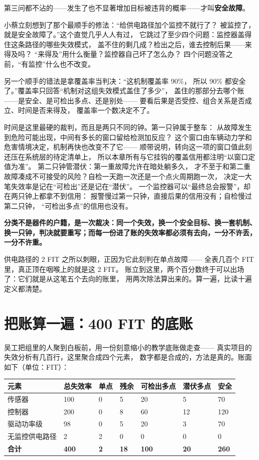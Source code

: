 第三问都不沾的——发生了也不显著增加目标被违背的概率——才叫\textbf{安全故障}。

小蔡立刻想到了那个最顺手的修法：“给供电路径加个监控不就行了？
被监控了，就是安全故障了。”这个直觉几乎人人有过，
它跳过了至少四个问题：监控器盖得住这条路径的哪些失效模式，
盖不住的剩几成？检出之后，谁去控制后果——来得及吗？
“来得及”用什么衡量？监控器自己坏了怎么办？
四个问题没答之前，“有监控”什么也不改变。

另一个顺手的错法是拿覆盖率当判决：“这机制覆盖率 90\%，
所以 90\% 都安全了。”覆盖率只回答“机制对这组失效模式盖住了多少”，
盖住的那部分去哪个账——是安全、是可检出多点、还是别处——
要看后果是否受控、组合关系是否成立、时间是否来得及，
覆盖率一个数决定不了。

时间是这里最硬的裁判，而且是两只不同的钟。第一只钟属于整车：
从故障发生到危险可能出现，中间有多长的窗口留给检测加反应？
这个窗口由车辆动力学和危害情境决定，机制再快也改变不了它——
顺带说明，转向这一项的窗口值此刻还压在系统层的待定清单上，
所以本章所有与它挂钩的覆盖信用都注明“以窗口定值为准”。
第二只钟管潜伏：第一重故障允许在暗处躺多久，
才不至于和第二重故障凑成不可接受的风险？自检一天跑一次还是一个点火周期跑一次，
决定一大笔失效率是记在“可检出”还是记在“潜伏”。
一个监控器可以“最终总会报警”，却在两只钟上都拿不到信用：
报警慢过第一只钟，直接后果的信用没有；自检慢过第二只钟，
“可检出多点”的信用也没有。

\textbf{分类不是器件的户籍，是一次裁决：同一个失效，换一个安全目标、换一套机制、换一只钟，判决就要重写；而每一份进了账的失效率都必须有去向，一分不许丢，一分不许重。}

供电路径的 2 FIT 之所以刺眼，正因为它此刻判在单点故障——
全表几百个 FIT 里，真正顶在咽喉上的就是这 2 FIT。
账立到这里，两个百分数终于可以出场了：它们就是从这笔五个去向的账里，
用两次除法算出来的。算一遍，比读十遍定义都清楚。

\section{把账算一遍：400 FIT 的底账}

吴工把组里的人聚到白板前，用一份刻意缩小的教学底账做走查——
真实项目的失效分析有几百行，这里聚合成四个元素，
数字都是合成的，方法是真的。账面如下（单位：FIT）：

\begin{center}
\begingroup\small
\setlength{\tabcolsep}{4pt}
\begin{tabularx}{\linewidth}{@{}XXXXXXX@{}}
\toprule
元素 & 总失效率 & 单点 & 残余 & 可检出多点 & 潜伏多点 & 安全 \\
\midrule
传感器 & 100 & 0 & 5 & 20 & 5 & 70 \\
控制器 & 200 & 0 & 8 & 60 & 12 & 120 \\
驱动功率级 & 98 & 0 & 5 & 20 & 3 & 70 \\
无监控供电路径 & 2 & 2 & 0 & 0 & 0 & 0 \\
\textbf{合计} & \textbf{400} & \textbf{2} & \textbf{18} & \textbf{100} & \textbf{20} & \textbf{260} \\
\bottomrule
\end{tabularx}
\endgroup
\end{center}

